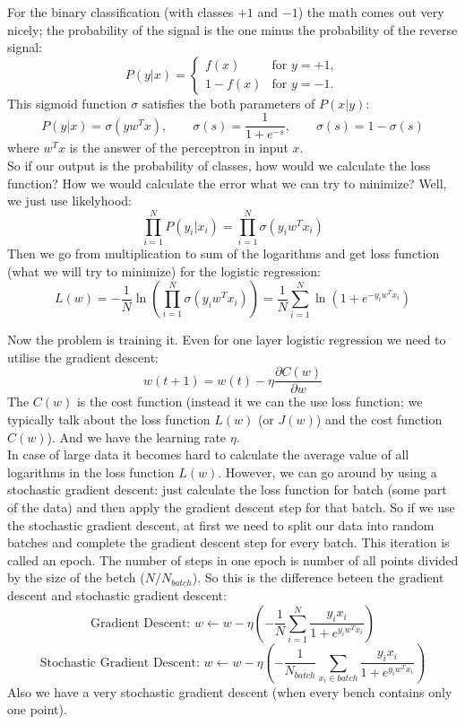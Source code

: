 For the binary classification (with classes $+1$ and $-1$) the math comes out very nicely; the probability of the signal is the one minus the probability of the reverse signal:
$$P(y|x)=\begin{cases}
f(x)&\text{for }y=+1,\\
1-f(x)&\text{for }y=-1.
\end{cases}$$
This sigmoid function $\sigma$ satisfies the both parameters of $P(x|y)$:
$$P(y|x)=\sigma(yw^Tx),\qquad\sigma(s)=\frac{1}{1+e^{-s}},\qquad \sigma(s)=1-\sigma(s)$$
where $w^Tx$ is the answer of the perceptron in input $x$.\\
So if our output is the probability of classes, how would we calculate the loss function? How we would calculate the error what we can try to minimize? Well, we just use likelyhood:
$$\prod\limits_{i=1}^{N}P(y_i|x_i)=\prod\limits_{i=1}^{N}\sigma(y_iw^Tx_i)$$
Then we go from multiplication to sum of the logarithms and get loss function (what we will try to minimize) for the logistic regression:
$$L(w)=-\frac{1}{N}\ln\left(\prod\limits_{i=1}^N\sigma(y_iw^Tx_i)\right)=\frac{1}{N}\sum\limits_{i=1}^N\ln(1+e^{-y_iw^Tx_i})$$

Now the problem is training it. Even for one layer logistic regression we need to utilise the gradient descent:
$$w(t+1)=w(t)-\eta\frac{\partial C(w)}{\partial w}$$
The $C(w)$ is the cost function (instead it we can the use loss function; we typically talk about the loss function $L(w)$ (or $J(w)$) and the cost function $C(w)$). And we have the learning rate $\eta$.\\
In case of large data it becomes hard to calculate the average value of all logarithms in the loss function $L(w)$. However, we can go around by using a stochastic gradient descent: just calculate the loss function for batch (some part of the data) and then apply the gradient descent step for that batch. So if we use the stochastic gradient descent, at first we need to split our data into random batches and complete the gradient descent step for every batch. This iteration is called an epoch. The number of steps in one epoch is number of all points divided by the size of the betch ($N / N_{batch}$).
So this is the difference beteen the gradient descent and stochastic gradient descent:
$$\text{Gradient Descent: }w\leftarrow w-\eta\left(-\frac{1}{N}\sum\limits_{i=1}^N\frac{y_ix_i}{1+e^{y_iw^Tx_i}}\right)$$
$$\text{Stochastic Gradient Descent: }w\leftarrow w-\eta\left(-\frac{1}{N_{batch}}\sum\limits_{x_i\in batch}\frac{y_ix_i}{1+e^{y_iw^Tx_i}}\right)$$
Also we have a very stochastic gradient descent (when every bench contains only one point).\\
{\it <The reason why very stochastic gradient descent is not the best way>}

